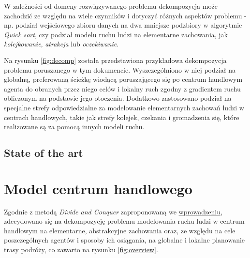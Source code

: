 \documentclass[a4paper, 12pt]{article}
\begin{document}
W zależności od domeny rozwiązywanego problemu dekompozycja może zachodzić ze względu na wiele czynników i dotyczyć różnych aspektów problemu - np. podział wejściowego zbioru danych na dwa mniejsze podzbiory w algorytmie \emph{Quick sort}, czy podział modelu ruchu ludzi na elementarne zachowania, jak \emph{kolejkowanie}, \emph{atrakcja} lub \emph{oczekiwanie}.

Na rysunku \ref{fig:decomp} została przedstawiona przykładowa dekompozycja problemu poruszanego w tym dokumencie. Wyszczególniono w niej podział na globalną, preferowaną ścieżkę wiodącą poruszającego się po centrum handlowym agenta do obranych przez niego celów i lokalny ruch zgodny z gradientem ruchu obliczonym na podstawie jego otoczenia. Dodatkowo zastosowano podział na specjalne strefy odpowiedzialne za modelowanie elementarnych zachowań ludzi w centrach handlowych, takie jak strefy kolejek, czekania i gromadzenia się, które realizowane są za pomocą innych modeli ruchu.

\newpage
    \subsection{State of the art}
    \label{sec:sota}


\newpage
    \section{Model centrum handlowego}
    \label{sec:mall-model}

\noindent
Zgodnie z metodą \emph{Divide and Conquer} zaproponowaną we \hyperref[sec:intro]{wprowadzeniu}, zdecydowano się na dekompozycję problemu modelowania ruchu ludzi w centrum handlowym na elementarne, abstrakcyjne zachowania oraz, ze względu na cele poszczególnych agentów i sposoby ich osiągania, na globalne i lokalne planowanie trasy podróży, co zawarto na rysunku \ref{fig:overview}.
\end{document}

